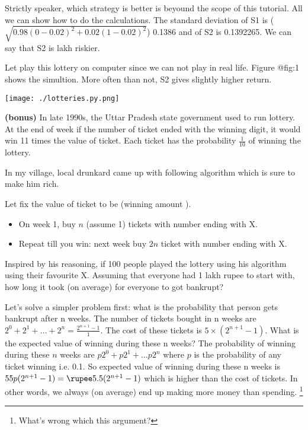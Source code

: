\documentclass[a4paper,9pt, addpoints, solutions]{exam}
\begin{document}
\begin{questions}
\begin{solution}
    Strictly speaker, which strategy is better is beyound the scope of this
    tutorial. All we can show how to do the calculations.  The standard deviation of
    S1 is ($\sqrt{0.98(0-0.02)^2+0.02(1-0.02)^2}$) 0.1386 and of S2 is
    0.1392265. We can say that S2 is  lakh riskier.

    Let play this lottery on computer since we can not play in real life.
    Figure @fig:1 shows the simultion. More often than not, S2 gives slightly
    higher return.

        \texttt{[image: ./lotteries.py.png]}
        \label{fig:lottery}
\end{solution}

\question[10]

\textbf{(bonus)} In late 1990s, the Uttar Pradesh state government used to run
lottery. At the end of week if the number of ticket ended with the winning
digit, it would win 11 times the value of ticket. Each ticket has the
probability $\frac{1}{10}$ of winning the lottery.

In my village, local drunkard  came up with following algorithm which is sure
to make him rich.

Let fix the value of ticket to be  (winning amount ).

\begin{itemize}
    \item On week 1, buy $n$ (assume 1) tickets with number ending with X.
    \item Repeat till you win: next week buy $2n$ ticket with number ending with X.
\end{itemize}

Inspired by his reasoning, if 100 people played the lottery using his algorithm
using their favourite X.  Assuming that everyone had 1 lakh rupee to start with,
how long it took (on average) for everyone to got bankrupt?

\begin{solution}
Let's solve a simpler problem first: what is the probability that
person gets bankrupt after n weeks. The number of tickets bought in n weeks are
$2^0 + 2^1 + \ldots + 2^n = \frac{2^{n+1}-1}{1}$. The cost of these tickets is
\rupee $5 \times (2^{n+1}-1)$. What is the expected value of winning during
these n weeks? The probability of winning during these $n$ weeks are $p2^0 +
p2^1 + \ldots p2^n$ where $p$ is the probability of any ticket winning i.e. 0.1.
So expected value of winning during these n weeks is \rupee$55p(2^{n+1} -
1)=\text{\rupee} 5.5 (2^{n+1}-1)$ which is higher than the cost of tickets. In
other words, we always (on average) end up making more money than spending.
\footnote{What's wrong which this argument?}


\end{solution}
\end{questions}
\end{document}
